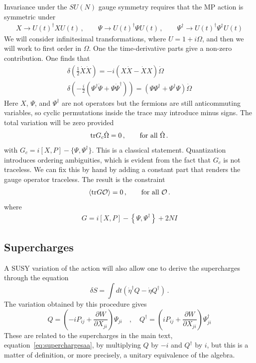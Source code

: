 \documentclass[a4paper,11pt]{article}
\renewcommand{\O}{{\cal O}}
\def\be{\begin{equation}}
\def\ee{\end{equation}}
\newcommand{\tr}{{\rm {tr}}}
\numberwithin{equation}{section}
\begin{document}
Invariance under the $SU(N)$ gauge symmetry requires that the MP action is symmetric under
%
\begin{align}
    X \to U(t)^\dagger X U(t)  \, , \qquad \Psi \to U(t)^\dagger \Psi  U(t) \, , \qquad \Psi^\dagger \to U(t)^\dagger \Psi^\dagger U(t)
\end{align}
%
We will consider infinitesimal transformations, where $U = 1 + i \Omega$, and then we will work to first order in $\Omega$. One the time-derivative parts give a non-zero contribution. One finds that 
%
\begin{align}
    \delta \left( \frac{1}{2} \dot X \dot X \right) = -i (  X \dot X -  \dot X X) \dot \Omega\\
    \delta \left( -\frac{i}{2} ( \Psi^\dagger \dot \Psi + \Psi \dot \Psi^\dagger)  \right)  =  (\Psi \Psi^\dagger + \Psi^\dagger \Psi ) \dot \Omega
\end{align}
%
Here $X$, $\Psi$, and $\Psi^\dagger$ are not operators but the fermions are still anticommuting variables, so cyclic permutations inside the trace may introduce minus signs. The total variation will be zero provided
%
\begin{align}
    \tr G_c \dot \Omega = 0 \, ,\qquad \text{for all } \dot \Omega \, .
\end{align}
%
with $G_c = i [X, P] - \{ \Psi, \Psi^\dagger \} $. This is a classical statement. Quantization introduces ordering ambiguities, which is evident from the fact that $G_c$ is not traceless. We can fix this by hand by adding a constant part that renders the gauge operator traceless. The result is the constraint
%
\begin{align}
    \langle \tr G \O  \rangle= 0 \, ,\qquad \text{for all } \O \, .
\end{align}
%
where 
%
\begin{align}
    G =  i \left[ X, P \right] - \left\{ \Psi, \Psi^\dagger \right\}  + 2 N I
\end{align}


\subsection{Supercharges}

A SUSY variation of the action will also allow one to derive the supercharges through the equation
\be
\delta S = \int dt \left( \dot{\eta}^\dagger Q - \dot{\eta} Q^\dagger \right) \, .
\ee
%
The variation obtained by this procedure gives
%
$$
Q = \left( - i P_{ij} + \frac{\partial W}{\partial X_{ji}}\right) \Psi_{ji}  \quad , \quad Q^\dagger = \left( i P_{ij} + \frac{\partial W}{\partial X_{ji}}\right) \Psi^\dagger_{ji}
$$
These are related to the supercharges in the main text, equation~\eqref{eq:superchargesaa}, by multiplying $Q$ by $-i$ and $Q^\dagger$ by $i$, but this is a matter of definition, or more precisely, a unitary equivalence of the algebra. 
\end{document}
